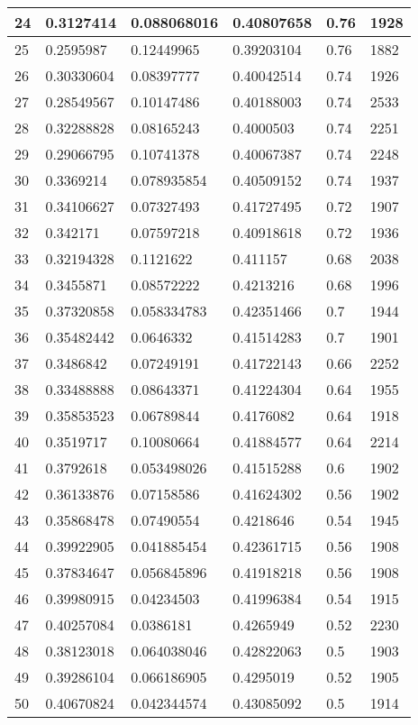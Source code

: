 \begin{longtable}{|l|l|l|l|l|l|}
24 & 0.3127414 & 0.088068016 & 0.40807658 & 0.76 & 1928 \\ \hline 
25 & 0.2595987 & 0.12449965 & 0.39203104 & 0.76 & 1882 \\ \hline 
26 & 0.30330604 & 0.08397777 & 0.40042514 & 0.74 & 1926 \\ \hline 
27 & 0.28549567 & 0.10147486 & 0.40188003 & 0.74 & 2533 \\ \hline 
28 & 0.32288828 & 0.08165243 & 0.4000503 & 0.74 & 2251 \\ \hline 
29 & 0.29066795 & 0.10741378 & 0.40067387 & 0.74 & 2248 \\ \hline 
30 & 0.3369214 & 0.078935854 & 0.40509152 & 0.74 & 1937 \\ \hline 
31 & 0.34106627 & 0.07327493 & 0.41727495 & 0.72 & 1907 \\ \hline 
32 & 0.342171 & 0.07597218 & 0.40918618 & 0.72 & 1936 \\ \hline 
33 & 0.32194328 & 0.1121622 & 0.411157 & 0.68 & 2038 \\ \hline 
34 & 0.3455871 & 0.08572222 & 0.4213216 & 0.68 & 1996 \\ \hline 
35 & 0.37320858 & 0.058334783 & 0.42351466 & 0.7 & 1944 \\ \hline 
36 & 0.35482442 & 0.0646332 & 0.41514283 & 0.7 & 1901 \\ \hline 
37 & 0.3486842 & 0.07249191 & 0.41722143 & 0.66 & 2252 \\ \hline 
38 & 0.33488888 & 0.08643371 & 0.41224304 & 0.64 & 1955 \\ \hline 
39 & 0.35853523 & 0.06789844 & 0.4176082 & 0.64 & 1918 \\ \hline 
40 & 0.3519717 & 0.10080664 & 0.41884577 & 0.64 & 2214 \\ \hline 
41 & 0.3792618 & 0.053498026 & 0.41515288 & 0.6 & 1902 \\ \hline 
42 & 0.36133876 & 0.07158586 & 0.41624302 & 0.56 & 1902 \\ \hline 
43 & 0.35868478 & 0.07490554 & 0.4218646 & 0.54 & 1945 \\ \hline 
44 & 0.39922905 & 0.041885454 & 0.42361715 & 0.56 & 1908 \\ \hline 
45 & 0.37834647 & 0.056845896 & 0.41918218 & 0.56 & 1908 \\ \hline 
46 & 0.39980915 & 0.04234503 & 0.41996384 & 0.54 & 1915 \\ \hline 
47 & 0.40257084 & 0.0386181 & 0.4265949 & 0.52 & 2230 \\ \hline 
48 & 0.38123018 & 0.064038046 & 0.42822063 & 0.5 & 1903 \\ \hline 
49 & 0.39286104 & 0.066186905 & 0.4295019 & 0.52 & 1905 \\ \hline 
50 & 0.40670824 & 0.042344574 & 0.43085092 & 0.5 & 1914 \\ \hline 
\end{longtable}